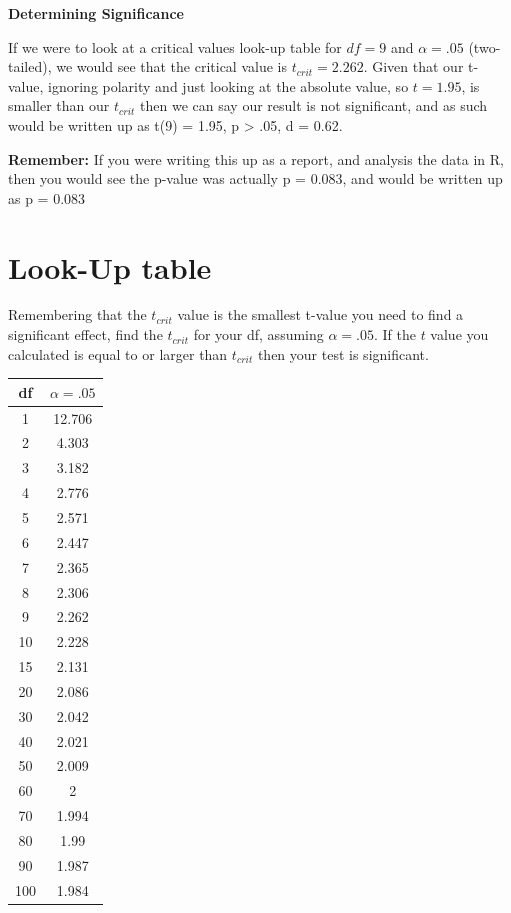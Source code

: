 \documentclass[
  oneside]{book}
\begin{document}
\textbf{Determining Significance}

If we were to look at a critical values look-up table for \(df = 9\) and \(\alpha = .05\) (two-tailed), we would see that the critical value is \(t_{crit} = 2.262\). Given that our t-value, ignoring polarity and just looking at the absolute value, so \(t = 1.95\), is smaller than our \(t_{crit}\) then we can say our result is not significant, and as such would be written up as t(9) = 1.95, p \textgreater{} .05, d = 0.62.

\textbf{Remember:} If you were writing this up as a report, and analysis the data in R, then you would see the p-value was actually p = 0.083, and would be written up as p = 0.083

\hypertarget{look-up-table-1}{%
\section{Look-Up table}\label{look-up-table-1}}

Remembering that the \(t_{crit}\) value is the smallest t-value you need to find a significant effect, find the \(t_{crit}\) for your df, assuming \(\alpha = .05\). If the \(t\) value you calculated is equal to or larger than \(t_{crit}\) then your test is significant.

\begin{longtable}[]{@{}cc@{}}
\toprule
df & \(\alpha = .05\) \\
\midrule
\endhead
1 & 12.706 \\
2 & 4.303 \\
3 & 3.182 \\
4 & 2.776 \\
5 & 2.571 \\
6 & 2.447 \\
7 & 2.365 \\
8 & 2.306 \\
9 & 2.262 \\
10 & 2.228 \\
15 & 2.131 \\
20 & 2.086 \\
30 & 2.042 \\
40 & 2.021 \\
50 & 2.009 \\
60 & 2 \\
70 & 1.994 \\
80 & 1.99 \\
90 & 1.987 \\
100 & 1.984 \\
\bottomrule
\end{longtable}
\end{document}
